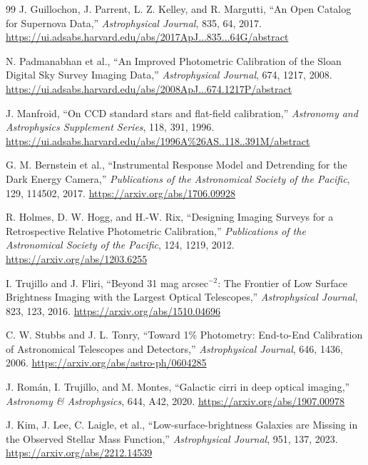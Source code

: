 \begin{thebibliography}{99}
J. Guillochon, J. Parrent, L. Z. Kelley, and R. Margutti,
``An Open Catalog for Supernova Data,''
\emph{Astrophysical Journal}, 835, 64, 2017.
\url{https://ui.adsabs.harvard.edu/abs/2017ApJ...835...64G/abstract}

N. Padmanabhan et al.,
``An Improved Photometric Calibration of the Sloan Digital Sky Survey Imaging Data,''
\emph{Astrophysical Journal}, 674, 1217, 2008.
\url{https://ui.adsabs.harvard.edu/abs/2008ApJ...674.1217P/abstract}

J. Manfroid,
``On CCD standard stars and flat-field calibration,''
\emph{Astronomy and Astrophysics Supplement Series}, 118, 391, 1996.
\url{https://ui.adsabs.harvard.edu/abs/1996A%26AS..118..391M/abstract}

G. M. Bernstein et al.,
``Instrumental Response Model and Detrending for the Dark Energy Camera,''
\emph{Publications of the Astronomical Society of the Pacific}, 129, 114502, 2017.
\url{https://arxiv.org/abs/1706.09928}

R. Holmes, D. W. Hogg, and H.-W. Rix,
``Designing Imaging Surveys for a Retrospective Relative Photometric Calibration,''
\emph{Publications of the Astronomical Society of the Pacific}, 124, 1219, 2012.
\url{https://arxiv.org/abs/1203.6255}

I. Trujillo and J. Fliri,
``Beyond 31 mag arcsec$^{-2}$: The Frontier of Low Surface Brightness Imaging with the Largest Optical Telescopes,''
\emph{Astrophysical Journal}, 823, 123, 2016.
\url{https://arxiv.org/abs/1510.04696}

C. W. Stubbs and J. L. Tonry,
``Toward 1\% Photometry: End-to-End Calibration of Astronomical Telescopes and Detectors,''
\emph{Astrophysical Journal}, 646, 1436, 2006.
\url{https://arxiv.org/abs/astro-ph/0604285}

J. Rom\'an, I. Trujillo, and M. Montes,
``Galactic cirri in deep optical imaging,''
\emph{Astronomy \& Astrophysics}, 644, A42, 2020.
\url{https://arxiv.org/abs/1907.00978}

J. Kim, J. Lee, C. Laigle, et al.,
``Low-surface-brightness Galaxies are Missing in the Observed Stellar Mass Function,''
\emph{Astrophysical Journal}, 951, 137, 2023.
\url{https://arxiv.org/abs/2212.14539}


\end{thebibliography}
